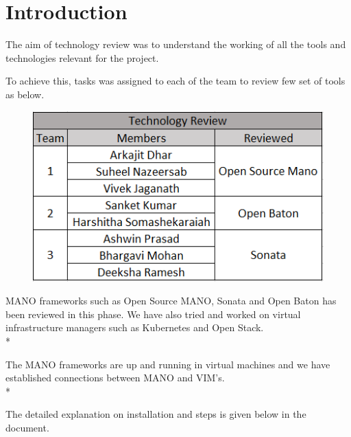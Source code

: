 \chapter{Introduction}
\label{ch:Introduction}

The aim of technology review was to understand the working of all the tools and technologies relevant for the project.

To achieve this, tasks was assigned to each of the team to review few set of tools as below. 

\begin{figure} [h]
\centering
\includegraphics[width=.5\linewidth]{figures/teams}
\end{figure}

MANO frameworks such as Open Source MANO, Sonata and Open Baton has been reviewed in this phase. We have also tried and worked on virtual infrastructure managers such as Kubernetes and Open Stack.\\*

The MANO frameworks are up and running in virtual machines and we have established connections between MANO and VIM's.\\*

The detailed explanation on installation and steps is given below in the document.



